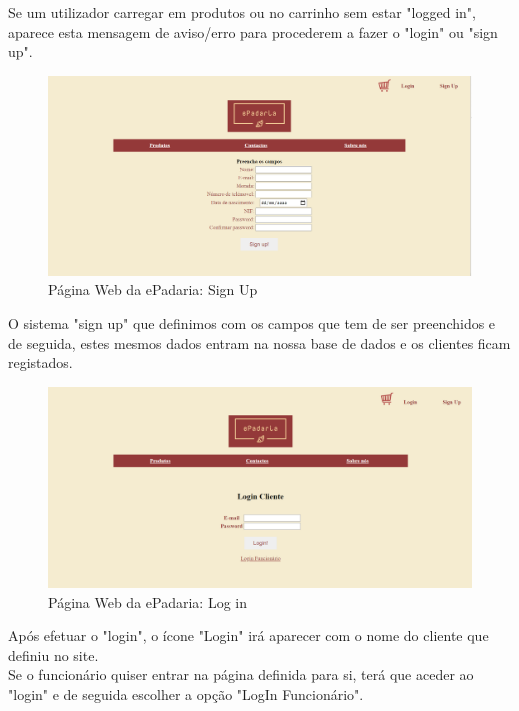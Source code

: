 Se um utilizador carregar em produtos ou no carrinho sem estar "logged in", aparece esta mensagem de aviso/erro para procederem a fazer o "login" ou "sign up".

\begin{figure}[H]
	\centering
	\includegraphics[width=15cm]{"mockup sig in"}
	\caption{Página Web da ePadaria: Sign Up}
	\label{fig:mockup-sig-in}
\end{figure}

O sistema "sign up" que definimos com os campos que tem de ser preenchidos e de seguida, estes mesmos dados entram na nossa base de dados e os clientes ficam registados.

\begin{figure}[H]
	\centering
	\includegraphics[width=15cm]{"mockup log in"}
	\caption{Página Web da ePadaria: Log in}
	\label{fig:mockup-log-in}
\end{figure}

Após efetuar o "login", o ícone "Login"  irá aparecer com o nome do cliente que definiu no site.\\
Se o funcionário quiser entrar na página definida para si, terá que aceder ao "login"  e de seguida escolher a opção  "LogIn Funcionário".


